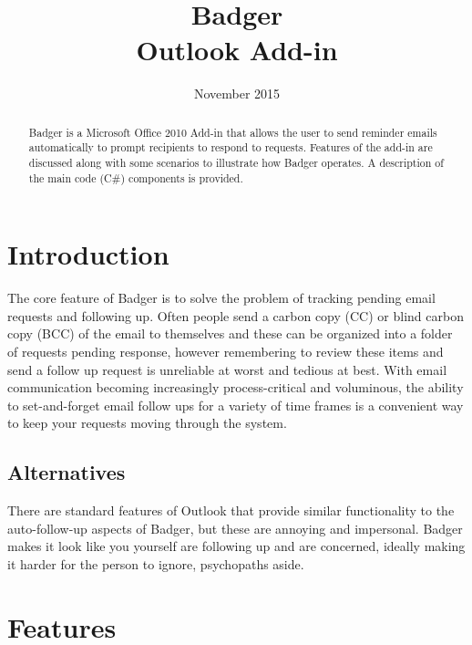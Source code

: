 \documentclass[12pt]{article}
\begin{document}
\title{Badger \\ Outlook Add-in}
\date{November 2015}

\begin{titlepage}
    \maketitle
    
    \begin{abstract}
        Badger is a Microsoft Office 2010 Add-in that allows the user to send reminder emails automatically to prompt recipients to respond to requests. Features of the add-in are discussed along with some scenarios to illustrate how Badger operates. A description of the main code (C\#) components is provided.
    \end{abstract}

\end{titlepage}

\tableofcontents{}

\section{Introduction}

The core feature of Badger is to solve the problem of tracking pending email requests and following up. Often people send a carbon copy (CC) or blind carbon copy (BCC) of the email to themselves and these can be organized into a folder of requests pending response, however remembering to review these items and send a follow up request is unreliable at worst and tedious at best. With email communication becoming increasingly process-critical and voluminous, the ability to set-and-forget email follow ups for a variety of time frames is a convenient way to keep your requests moving through the system.

\subsection{Alternatives}

There are standard features of Outlook that provide similar functionality to the auto-follow-up aspects of Badger, but these are annoying and impersonal. Badger makes it look like you yourself are following up and are concerned, ideally making it harder for the person to ignore, psychopaths aside.

\section{Features}
\end{document}
